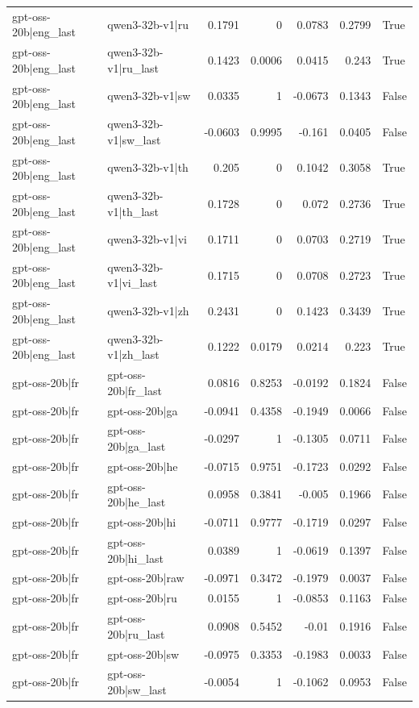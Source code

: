 \begin{table}
\begin{tabular}{l l r r r r l}
gpt-oss-20b|eng_last & qwen3-32b-v1|ru & 0.1791 & 0 & 0.0783 & 0.2799 & True \\
gpt-oss-20b|eng_last & qwen3-32b-v1|ru_last & 0.1423 & 0.0006 & 0.0415 & 0.243 & True \\
gpt-oss-20b|eng_last & qwen3-32b-v1|sw & 0.0335 & 1 & -0.0673 & 0.1343 & False \\
gpt-oss-20b|eng_last & qwen3-32b-v1|sw_last & -0.0603 & 0.9995 & -0.161 & 0.0405 & False \\
gpt-oss-20b|eng_last & qwen3-32b-v1|th & 0.205 & 0 & 0.1042 & 0.3058 & True \\
gpt-oss-20b|eng_last & qwen3-32b-v1|th_last & 0.1728 & 0 & 0.072 & 0.2736 & True \\
gpt-oss-20b|eng_last & qwen3-32b-v1|vi & 0.1711 & 0 & 0.0703 & 0.2719 & True \\
gpt-oss-20b|eng_last & qwen3-32b-v1|vi_last & 0.1715 & 0 & 0.0708 & 0.2723 & True \\
gpt-oss-20b|eng_last & qwen3-32b-v1|zh & 0.2431 & 0 & 0.1423 & 0.3439 & True \\
gpt-oss-20b|eng_last & qwen3-32b-v1|zh_last & 0.1222 & 0.0179 & 0.0214 & 0.223 & True \\
gpt-oss-20b|fr & gpt-oss-20b|fr_last & 0.0816 & 0.8253 & -0.0192 & 0.1824 & False \\
gpt-oss-20b|fr & gpt-oss-20b|ga & -0.0941 & 0.4358 & -0.1949 & 0.0066 & False \\
gpt-oss-20b|fr & gpt-oss-20b|ga_last & -0.0297 & 1 & -0.1305 & 0.0711 & False \\
gpt-oss-20b|fr & gpt-oss-20b|he & -0.0715 & 0.9751 & -0.1723 & 0.0292 & False \\
gpt-oss-20b|fr & gpt-oss-20b|he_last & 0.0958 & 0.3841 & -0.005 & 0.1966 & False \\
gpt-oss-20b|fr & gpt-oss-20b|hi & -0.0711 & 0.9777 & -0.1719 & 0.0297 & False \\
gpt-oss-20b|fr & gpt-oss-20b|hi_last & 0.0389 & 1 & -0.0619 & 0.1397 & False \\
gpt-oss-20b|fr & gpt-oss-20b|raw & -0.0971 & 0.3472 & -0.1979 & 0.0037 & False \\
gpt-oss-20b|fr & gpt-oss-20b|ru & 0.0155 & 1 & -0.0853 & 0.1163 & False \\
gpt-oss-20b|fr & gpt-oss-20b|ru_last & 0.0908 & 0.5452 & -0.01 & 0.1916 & False \\
gpt-oss-20b|fr & gpt-oss-20b|sw & -0.0975 & 0.3353 & -0.1983 & 0.0033 & False \\
gpt-oss-20b|fr & gpt-oss-20b|sw_last & -0.0054 & 1 & -0.1062 & 0.0953 & False \\

\end{tabular}
\end{table}
